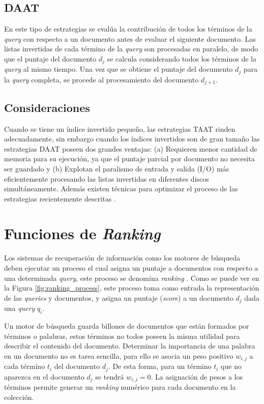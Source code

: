 \subsection{DAAT}
En este tipo de estrategias se evalúa la contribución de todos los términos de la \textit{query} con respecto a un documento antes de evaluar el siguiente documento. Las listas invertidas de cada término de la \textit{query} son procesadas en paralelo, de modo que el puntaje del documento $d_{j}$ se calcula considerando todos los términos de la \textit{query} al mismo tiempo. Una vez que se obtiene el puntaje del documento $d_{j}$ para la \textit{query} completa, se procede al procesamiento del documento $d_{j+1}$.

\subsection{Consideraciones}
Cuando se tiene un índice invertido pequeño, las estrategias TAAT rinden adecuadamente, sin embargo cuando los índices invertidos son de gran tamaño las estrategias DAAT poseen dos grandes ventajas: (a) Requieren menor cantidad de memoria para su ejecución, ya que el puntaje parcial por documento no necesita ser guardado y (b) Explotan el paralismo de entrada y salida (I/O) más eficientemente procesando las listas invertidas en diferentes discos simultáneamente. Además existen técnicas para optimizar el proceso de las estrategias recientemente descritas \citep{Turtle:1995}.

\section{Funciones de \textit{Ranking}}
\label{marco:ranking}
Los sistemas de recuperación de información como los motores de búsqueda deben ejecutar un proceso el cual asigna un puntaje a documentos con respecto a una determinada \textit{query}, este proceso se denomina \textit{ranking} \citep{Baeza-Yates:2011}. Como se puede ver en la Figura \ref{fig:ranking_process}, este proceso toma como entrada la representación de las \textit{queries} y documentos, y asigna un puntaje (\textit{score}) a un documento $d_{j}$ dada una \textit{query} $q_{i}$.

Un motor de búsqueda guarda billones de documentos que están formados por términos o palabras, estos términos no todos poseen la misma utilidad para describir el contenido del documento. Determinar la importancia de una palabra en un documento no es tarea sencilla, para ello se asocia un peso positivo $w_{i,j}$ a cada término $t_{i}$ del documento $d_{j}$. De esta forma, para un término $t_{i}$ que no aparezca en el documento $d_{j}$ se tendrá $w_{i,j} = 0$. La asignación de pesos a los términos permite generar un \textit{ranking} numérico para cada documento en la colección.


